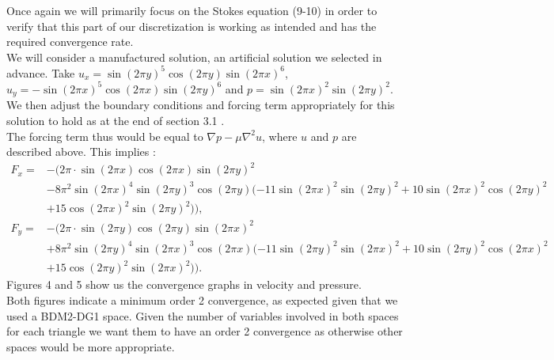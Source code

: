 \documentclass[11pt,twoside,a4paper]{article}
\begin{document}
Once again we will primarily focus on the Stokes equation (9-10) in order to verify that this part of our discretization is working as intended and has the required convergence rate.\\
We will consider a manufactured solution, an artificial solution we selected in advance. Take $u_x = \sin(2 \pi y)^5 \cos(2 \pi y)\sin(2 \pi x)^6$, $u_y= -\sin(2 \pi x)^5 \cos(2 \pi x) \sin(2 \pi y)^6$ and $p = \sin(2 \pi x)^2 \sin(2 \pi y)^2$.\\
We then adjust the boundary conditions and forcing term appropriately for this solution to hold as at the end of section 3.1 .\\
The forcing term thus would be equal to $\nabla p - \mu \nabla^2 u$, where $u$ and $p$ are described above. This implies :
\begin{align*}
F_x =& -(2 \pi \cdot \sin( 2 \pi x) \cos(2 \pi x) \sin(2 \pi y)^2 \\
	&- 8 \pi^2 \sin(2 \pi x)^4 \sin(2 \pi y)^3 \cos(2 \pi y)(-11 \sin(2 \pi x)^2 \sin(2 \pi y)^2 + 10 \sin(2 \pi x)^2 \cos(2 \pi y)^2 \\
	& + 15 \cos(2 \pi x)^2 \sin(2 \pi y)^2 )),\\
F_y = &-(2 \pi \cdot \sin( 2 \pi y) \cos(2 \pi y) \sin(2 \pi x)^2 \\
	&+ 8 \pi^2 \sin(2 \pi y)^4 \sin(2 \pi x)^3 \cos(2 \pi x)(-11 \sin(2 \pi y)^2 \sin(2 \pi x)^2 + 10 \sin(2 \pi y)^2 \cos(2 \pi x)^2 \\
	&+ 15 \cos(2 \pi y)^2 \sin(2 \pi x)^2 )).
\end{align*}
Figures 4 and 5 show us the convergence graphs in velocity and pressure.\\
Both figures indicate a minimum order 2 convergence, as expected given that we used a BDM2-DG1 space. Given the number of variables involved in both spaces for each triangle we want them to have an order 2 convergence as otherwise other spaces would be more appropriate.
\\
\end{document}

